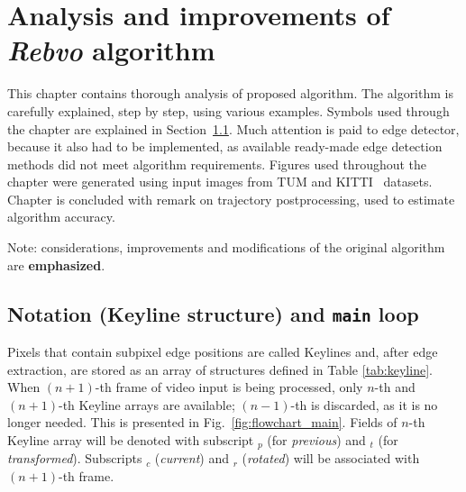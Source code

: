 \chapter{Analysis and improvements of \textit{Rebvo} algorithm}
\label{cha:intro2}

This chapter contains thorough analysis of proposed algorithm. The algorithm is carefully explained, step by step, using various examples. Symbols used through the chapter are explained in Section~\ref{sec:struct}. Much attention is paid to edge detector, because it also had to be implemented, as available ready-made edge detection methods did not meet algorithm requirements. Figures used throughout the chapter were generated using input images from TUM \cite{tum} and KITTI~\cite{kitti} datasets. Chapter is concluded with remark on trajectory postprocessing, used to estimate algorithm accuracy.

Note: considerations, improvements and modifications of the original algorithm are \textbf{emphasized}.

\section{Notation (Keyline structure) and {\tt main} loop}
\label{sec:struct}

Pixels that contain subpixel edge positions are called Keylines and, after edge extraction, are stored as an array of structures defined in Table \ref{tab:keyline}. When $(n+1)$-th frame of video input is being processed, only $n$-th and $(n+1)$-th Keyline arrays are available; $(n-1)$-th is discarded, as it is no longer needed. This is presented in Fig.~\ref{fig:flowchart_main}. Fields of $n$-th Keyline array will be denoted with subscript $_{p}$ (for \textit{previous}) and $_{t}$ (for \textit{transformed}). Subscripts $_{c}$ (\textit{current}) and $_{r}$ (\textit{rotated}) will be associated with $(n+1)$-th frame.

